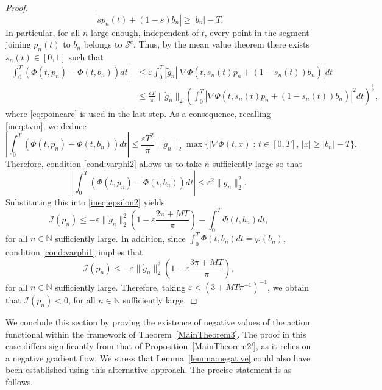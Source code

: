 \documentclass{article}
\newcommand{\boI}{\mathcal{I}}
\newcommand{\boS}{\mathcal{S}}
\theoremstyle{definition}
\begin{document}
\begin{proof}
\begin{equation}
    |s p_n(t)+(1-s)b_n|\geq |b_n|-T.
\end{equation}
    In particular, for all $n$ large enough, independent of $t$, every point in the segment joining $p_n(t)$ to $b_n$ belongs to $\boS^c$. Thus, by the mean value theorem there exists $s_n(t)\in [0,1]$ such that
\begin{align*}
    \left|\int_0^T(\Phi(t,p_n)-\Phi(t,b_n))dt\right|&\leq \varepsilon\int_0^T|\tilde g_n||\nabla\Phi(t,s_n(t)p_n+(1-s_n(t))b_n)|dt
    \\
    &\leq\frac{\varepsilon T}{\pi}\|\dot g_n\|_2\left(\int_0^T \left|\nabla\Phi(t,s_n(t)p_n+(1-s_n(t))b_n)\right|^2dt\right)^\frac12,
\end{align*}
where \eqref{eq:poincare} is used in the last step. As a consequence, recalling \eqref{ineq:tvm}, we deduce
\begin{equation*}
    \left|\int_0^T(\Phi(t,p_n)-\Phi(t,b_n))dt\right|\leq \frac{\varepsilon T^2}{\pi}\|\dot g_n\|_2\max\{|\nabla\Phi(t,x)|:\, t\in [0,T],\, |x|\geq|b_n|-T\}.
\end{equation*}
Therefore, condition \eqref{cond:varphi2} allows us to take $n$ sufficiently large so that
\begin{equation*}
    \left|\int_0^T(\Phi(t,p_n)-\Phi(t,b_n))dt\right|\leq \varepsilon^2\|\dot g_n\|_2^2.
\end{equation*}
Substituting this into \eqref{ineq:epsilon2} yields
\begin{equation}\label{ineq:epsilon2'}
        \boI(p_n) \leq-\varepsilon\|\dot{g}_n\|_2^2   \left(1-\varepsilon\frac{2\pi+MT}{\pi}\right)- \int_0^T\Phi(t,b_n)dt,
    \end{equation}
    for all $n\in\mathbb{N}$ sufficiently large. In addition, since $\int_0^T\Phi(t,b_n)dt=\varphi(b_n)$, condition \eqref{cond:varphi1} implies that
\begin{equation*}
        \boI(p_n) \leq-\varepsilon\|\dot{g}_n\|_2^2   \left(1-\varepsilon\frac{3\pi+MT}{\pi}\right),
    \end{equation*}
    for all $n \in \mathbb{N}$ sufficiently large. Therefore, taking $\varepsilon < \left(3 + MT\pi^{-1}\right)^{-1}$, we obtain that $\boI(p_n) < 0$, for all $n \in \mathbb{N}$ sufficiently large.
\end{proof}

We conclude this section by proving the existence of negative values of the action functional within the framework of Theorem~\ref{MainTheorem3}. The proof in this case differs significantly from that of Proposition~\ref{MainTheorem2'}, as it relies on a negative gradient flow. We stress that Lemma~\ref{lemma:negative} could also have been established using this alternative approach. The precise statement is as follows.
\end{document}

